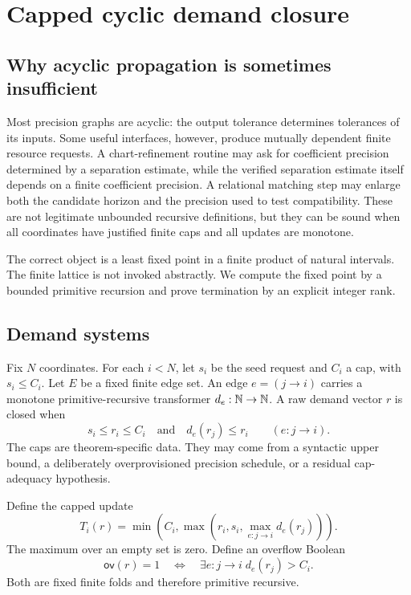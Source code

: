 \section{Capped cyclic demand closure}\label{sec:cyclic-demand}

\subsection{Why acyclic propagation is sometimes insufficient}

Most precision graphs are acyclic: the output tolerance determines tolerances of its inputs.  Some useful interfaces, however, produce mutually dependent finite resource requests.  A chart-refinement routine may ask for coefficient precision determined by a separation estimate, while the verified separation estimate itself depends on a finite coefficient precision.  A relational matching step may enlarge both the candidate horizon and the precision used to test compatibility.  These are not legitimate unbounded recursive definitions, but they can be sound when all coordinates have justified finite caps and all updates are monotone.

The correct object is a least fixed point in a finite product of natural intervals.  The finite lattice is not invoked abstractly.  We compute the fixed point by a bounded primitive recursion and prove termination by an explicit integer rank.

\subsection{Demand systems}

Fix \(N\) coordinates.  For each \(i<N\), let \(s_i\) be the seed request and \(C_i\) a cap, with \(s_i\le C_i\).  Let \(E\) be a fixed finite edge set.  An edge \(e=(j\to i)\) carries a monotone primitive-recursive transformer \(d_e:\mathbb N\to\mathbb N\).  A raw demand vector \(r\) is closed when
\[
   s_i\le r_i\le C_i
   \quad\text{and}\quad
   d_e(r_j)\le r_i\qquad(e:j\to i).
\]
The caps are theorem-specific data.  They may come from a syntactic upper bound, a deliberately overprovisioned precision schedule, or a residual cap-adequacy hypothesis.

Define the capped update
\[
 T_i(r)=\min\!\left(C_i,
   \max\left(r_i,s_i,\max_{e:j\to i}d_e(r_j)\right)\right).
\]
The maximum over an empty set is zero.  Define an overflow Boolean
\[
  \mathsf{ov}(r)=1
  \quad\Longleftrightarrow\quad
  \exists e:j\to i\; d_e(r_j)>C_i.
\]
Both are fixed finite folds and therefore primitive recursive.


